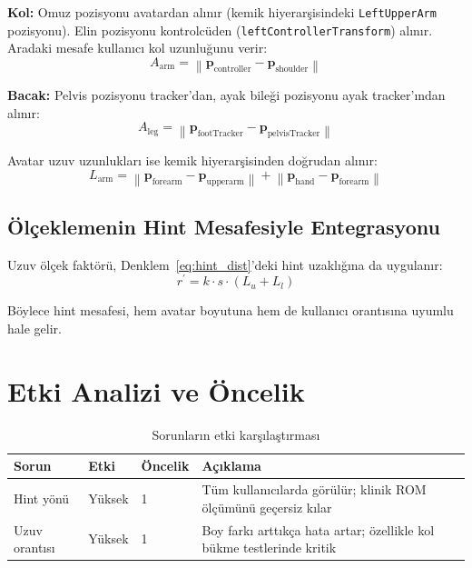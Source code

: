 \documentclass[11pt,a4paper]{article}
\begin{document}
\textbf{Kol:} Omuz pozisyonu avatardan al{\i}n{\i}r (kemik hiyerar\c{s}isindeki
\texttt{LeftUpperArm} pozisyonu). Elin pozisyonu kontrolc\"uden
(\texttt{leftControllerTransform}) al{\i}n{\i}r. Aradaki mesafe kullan{\i}c{\i}
kol uzunlu\u{g}unu verir:
\begin{equation}
    A_{\text{arm}} = \left\|\mathbf{p}_{\text{controller}} - \mathbf{p}_{\text{shoulder}}\right\|
    \label{eq:user_arm}
\end{equation}

\textbf{Bacak:} Pelvis pozisyonu tracker'dan, ayak bile\u{g}i pozisyonu
ayak tracker'{\i}ndan al{\i}n{\i}r:
\begin{equation}
    A_{\text{leg}} = \left\|\mathbf{p}_{\text{footTracker}} - \mathbf{p}_{\text{pelvisTracker}}\right\|
    \label{eq:user_leg}
\end{equation}

Avatar uzuv uzunluklar{\i} ise kemik hiyerar\c{s}isinden do\u{g}rudan al{\i}n{\i}r:
\begin{equation}
    L_{\text{arm}} = \left\|\mathbf{p}_{\text{forearm}} - \mathbf{p}_{\text{upperarm}}\right\| +
    \left\|\mathbf{p}_{\text{hand}} - \mathbf{p}_{\text{forearm}}\right\|
    \label{eq:avatar_arm}
\end{equation}

\subsection{\"Ol\c{c}eklemenin Hint Mesafesiyle Entegrasyonu}

Uzuv \"ol\c{c}ek fakt\"or\"u, Denklem~\ref{eq:hint_dist}'deki hint
uzakl{\i}\u{g}{\i}na da uygulan{\i}r:
\begin{equation}
    r^{\prime} = k \cdot s \cdot (L_u + L_l)
    \label{eq:scaled_hint}
\end{equation}

B\"oylece hint mesafesi, hem avatar boyutuna hem de kullan{\i}c{\i}
orant{\i}s{\i}na uyumlu hale gelir.

\section{Etki Analizi ve \"Oncelik}
\label{sec:etki}

\begin{table}[H]
\centering
\caption{Sorunlar{\i}n etki kar\c{s}{\i}la\c{s}t{\i}rmas{\i}}
\label{tab:etki}
\renewcommand{\arraystretch}{1.2}
\begin{tabularx}{\textwidth}{lllX}
\toprule
\textbf{Sorun} & \textbf{Etki} & \textbf{\"Oncelik} & \textbf{A\c{c}{\i}klama} \\
\midrule
Hint y\"on\"u & Y\"uksek & 1 & T\"um kullan{\i}c{\i}larda g\"or\"ul\"ur; klinik ROM \"ol\c{c}\"um\"un\"u ge\c{c}ersiz k{\i}lar \\
Uzuv orant{\i}s{\i} & Y\"uksek & 1 & Boy fark{\i} artt{\i}k\c{c}a hata artar; \"ozellikle kol b\"ukme testlerinde kritik \\
\bottomrule
\end{tabularx}
\end{table}
\end{document}
